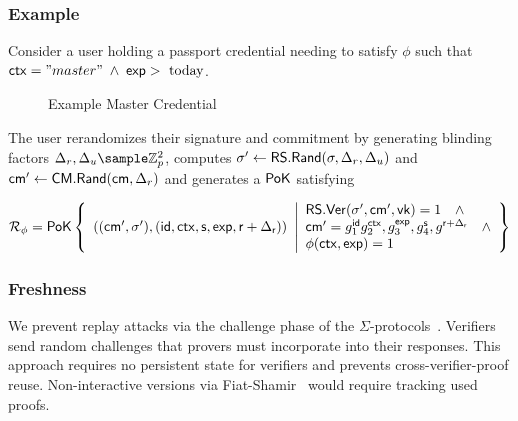 \subsubsection{Example}
Consider a user holding a passport credential needing to satisfy $\phi$ such that $\mathsf{ctx}="master" \; \wedge \; \mathsf{exp} > \text{ today}$. 

\begin{figure}[htbp]
        \begin{pchstack}[boxed, center, space=4em]
            \begin{pcvstack}
            \end{pcvstack}
        \end{pchstack}
    \caption{Example Master Credential}
    \label{fig:master-cred}
\end{figure}

The user rerandomizes their signature and commitment by generating blinding factors $\Delta_r, \Delta_u \sample \Z_p^2$, computes $\sigma' \gets \mathsf{RS.Rand}(\sigma, \Delta_r, \Delta_u)$ and $\mathsf{cm}' \gets \mathsf{CM.Rand}(\mathsf{cm}, \Delta_r)$ and generates a ${\mathsf{PoK}}$ satisfying 

     \[
    \mathcal{R}_\phi = {\mathsf{PoK}} \left\{ 
    \begin{array}{l} 
    ((\mathsf{cm}', \sigma'),(\mathsf{id}, \mathsf{ctx}, \mathsf{s}, \mathsf{exp}, \mathsf{r}+\Delta_{\mathsf{r}})) \\
    \end{array} 
    \middle|
    \begin{array}{l}
    \mathsf{RS.Ver}(\sigma', \mathsf{cm}', \mathsf{vk}) = 1 \quad \wedge \\
    \mathsf{cm}' = g_1^{\mathsf{id}}g_2^{\mathsf{ctx}},g_3^{\mathsf{exp}},g_4^{\mathsf{s}}, g^{\mathsf{r}+\Delta_{\mathsf{r}}} \quad \wedge  \\
    \phi(\mathsf{ctx}, \mathsf{exp}) = 1
    \end{array} 
    \right\}
    \]




\subsubsection{Freshness}
We prevent replay attacks via the challenge phase of the $\Sigma$-protocols~\cite{desmedt_proofs_1994, damgard_sigma_2010}. Verifiers send random challenges that provers must incorporate into their responses. This approach requires no persistent state for verifiers and prevents cross-verifier-proof reuse. Non-interactive versions via Fiat-Shamir~\cite{odlyzko_how_1986} would require tracking used proofs.

